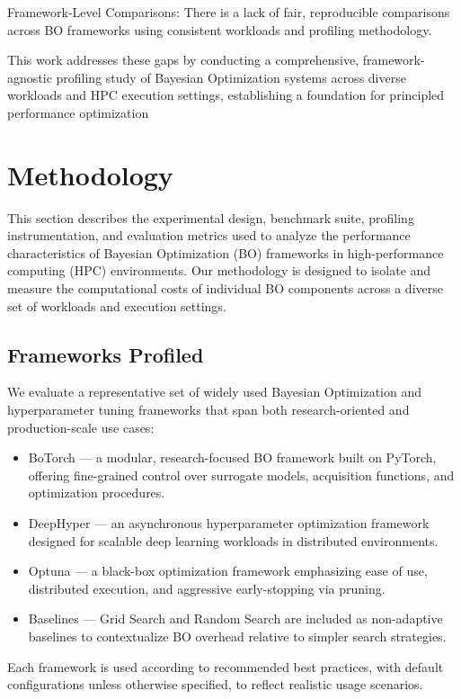 \documentclass[11pt]{article}
\begin{document}
Framework-Level Comparisons: There is a lack of fair, reproducible comparisons across BO frameworks using consistent workloads and profiling methodology.

This work addresses these gaps by conducting a comprehensive, framework-agnostic profiling study of Bayesian Optimization systems across diverse workloads and HPC execution settings, establishing a foundation for principled performance optimization
\section{Methodology}
This section describes the experimental design, benchmark suite, profiling instrumentation, and evaluation metrics used to analyze the performance characteristics of Bayesian Optimization (BO) frameworks in high-performance computing (HPC) environments. Our methodology is designed to isolate and measure the computational costs of individual BO components across a diverse set of workloads and execution settings.
\subsection{Frameworks Profiled}

We evaluate a representative set of widely used Bayesian Optimization and hyperparameter tuning frameworks that span both research-oriented and production-scale use cases:
\begin{itemize}
    \item BoTorch — a modular, research-focused BO framework built on PyTorch, offering fine-grained control over surrogate models, acquisition functions, and optimization procedures.
    \item DeepHyper — an asynchronous hyperparameter optimization framework designed for scalable deep learning workloads in distributed environments.

    \item Optuna — a black-box optimization framework emphasizing ease of use, distributed execution, and aggressive early-stopping via pruning.
    \item Baselines — Grid Search and Random Search are included as non-adaptive baselines to contextualize BO overhead relative to simpler search strategies.
\end{itemize}
Each framework is used according to recommended best practices, with default configurations unless otherwise specified, to reflect realistic usage scenarios.
\end{document}
